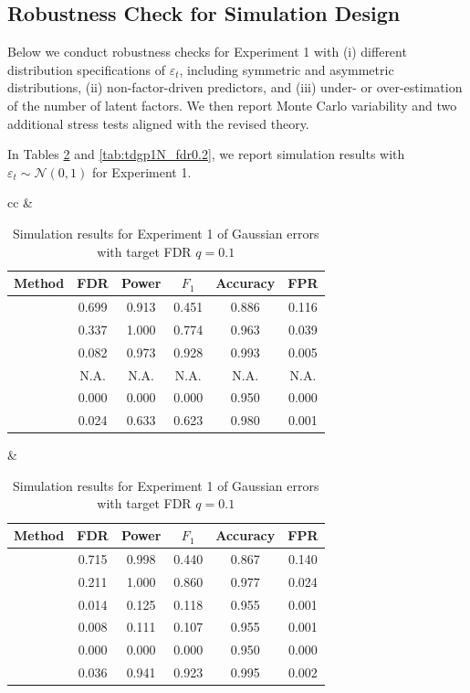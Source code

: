 ﻿\documentclass[12pt]{article}
\newcommand{\0}{\mbox{\bf 0}}
\theoremstyle{plain}%
\theoremstyle{definition}
\begin{document}
{\subsection{Robustness Check for Simulation Design}\label{sec:gaussian_error}

Below we conduct robustness checks for Experiment 1 with (i) different
distribution specifications of $\varepsilon_t$, including symmetric and
asymmetric distributions, (ii) non-factor-driven predictors, and (iii) under-
or over-estimation of the number of latent factors.  We then report Monte Carlo
variability and two additional stress tests aligned with the revised theory.

In Tables \ref{tab:tdgp1N_fdr0.1} and \ref{tab:tdgp1N_fdr0.2}, we report simulation results with $\varepsilon_t \sim \mathcal{N}(0, 1)$ for Experiment 1.

\begin{table}[htbp]
\caption{Simulation results for Experiment 1 of Gaussian errors with target FDR $q = 0.1$}
\label{tab:tdgp1N_fdr0.1}
\centering
\scriptsize
\setlength{\tabcolsep}{4pt}
\renewcommand{\arraystretch}{1.05}
\begin{tabular}{cc}
 &  \\
\begin{tabular}{lccccc}
\toprule
Method & FDR & Power & $F_1$ & Accuracy & FPR \\
\midrule
\sc{Lasso}         & 0.699  & 0.913  & 0.451  & 0.886  & 0.116 \\
\sc{FarmSelect}    & 0.337  & 1.000  & 0.774  & 0.963  & 0.039 \\
\sc{Model-X}       & 0.082  & 0.973  & 0.928  & 0.993  & 0.005 \\
\sc{Fixed-X}       & N.A.  & N.A.  & N.A.  & N.A.  & N.A.  \\
\sc{TSKI}          & 0.000  & 0.000  & 0.000  & 0.950  & 0.000 \\
\sc{FAR-Knockoff} & 0.024 & 0.633 & 0.623 & 0.980 & 0.001 \\

\bottomrule
\end{tabular}
&
\begin{tabular}{lccccc}
\toprule
Method & FDR & Power & $F_1$ & Accuracy & FPR \\
\midrule
\sc{Lasso}         & 0.715  & 0.998  & 0.440  & 0.867  & 0.140 \\
\sc{FarmSelect}    & 0.211  & 1.000  & 0.860  & 0.977  & 0.024 \\
\sc{Model-X}       & 0.014  & 0.125  & 0.118  & 0.955  & 0.001 \\
\sc{Fixed-X }      & 0.008  & 0.111  & 0.107  & 0.955  & 0.001 \\
\sc{TSKI}          & 0.000 & 0.000 & 0.000 & 0.950 & 0.000 \\
\sc{FAR-Knockoff} & 0.036 & 0.941 & 0.923 & 0.995 & 0.002 \\


\end{tabular}
\end{tabular}
\end{table}}
\end{document}
